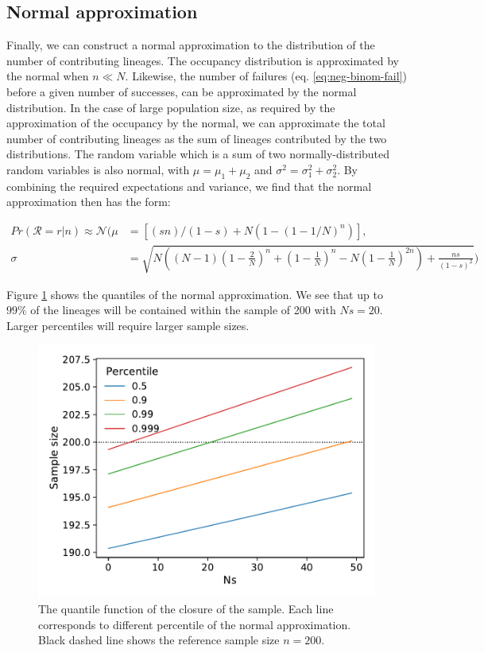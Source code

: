 \documentclass[review]{elsarticle}
\begin{document}
\subsection{Normal approximation}

Finally, we can construct a normal approximation to the distribution of the number of contributing
lineages. The occupancy distribution is approximated by the normal \citep{ONeill2019} when $n \ll N$.
Likewise, the number of failures (eq. \eqref{eq:neg-binom-fail}) before a given number of successes,
can be approximated by the normal distribution. In the case of large population size, as required by
the approximation of the occupancy by the normal, we can approximate the total number of
contributing lineages as the sum of lineages contributed by the two distributions. The random
variable which is a sum of two normally-distributed random variables is also normal, with
$\mu=\mu_1+\mu_2$ and $\sigma^2 = \sigma^2_1 + \sigma^2_2$. By combining the required expectations
and variance, we find that the normal approximation then has the form:

\begin{align}
  \label{eq:normal-approximation}
  Pr(\mathcal{R}=r|n) \approx \mathcal{N}( \mu &= \left[(s n)/(1 - s) + N (1 - (1 - 1/N)^n)\right],\\
  \sigma &= \sqrt{N \left((N-1) \left(1-\frac{2}{N}\right)^n+\left(1-\frac{1}{N}\right)^n-N\left(1-\frac{1}{N}\right)^{2 n}\right)+\frac{n s}{(1-s)^2}})
\end{align}

Figure \ref{fig:normal-approximation} shows the quantiles of the normal approximation. We see that
up to $99\%$ of the lineages will be contained within the sample of 200 with $Ns=20$. Larger
percentiles will require larger sample sizes.

\begin{figure}
  \centering
  \includegraphics[]{fig/quantile.pdf}
   \caption{The quantile function of the closure of the sample. Each line corresponds to different
     percentile of the normal approximation. Black dashed line shows the reference sample size $n=200$.}
  \label{fig:normal-approximation}
\end{figure}
\end{document}

